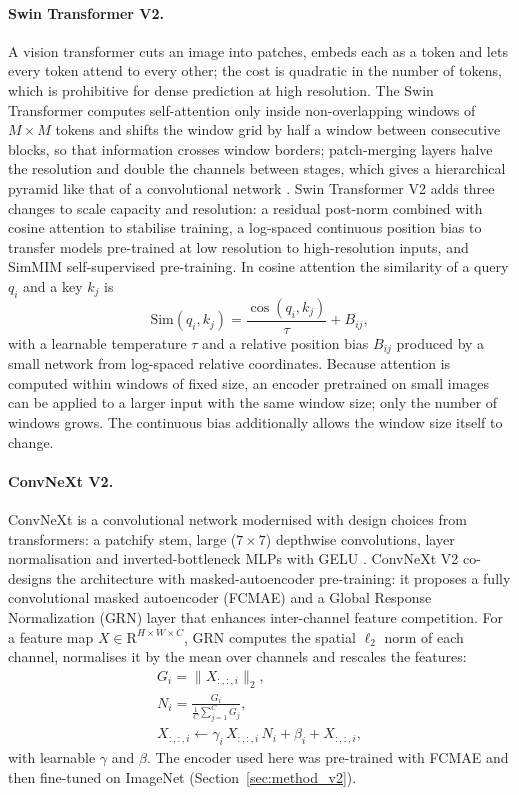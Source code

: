 \paragraph{Swin Transformer V2.} A vision transformer cuts an image into patches, embeds each as a token and lets every token attend to every
other; the cost is quadratic in the number of tokens, which is prohibitive for dense prediction at high resolution. The Swin Transformer computes
self-attention only inside non-overlapping windows of $M\times M$ tokens and shifts the window grid by half a window between consecutive blocks, so
that information crosses window borders; patch-merging layers halve the resolution and double the channels between stages, which gives a
hierarchical pyramid like that of a convolutional network \citep{dosovitskiy2021vit,liu2021swin}. Swin Transformer V2 \citep{liu2022swinv2} adds three changes to scale capacity and
resolution: a residual post-norm combined with cosine attention to stabilise training, a log-spaced continuous position bias to transfer models
pre-trained at low resolution to high-resolution inputs, and SimMIM self-supervised pre-training. In cosine attention the similarity of a query
$q_i$ and a key $k_j$ is
\begin{equation}
\mathrm{Sim}(q_i,k_j)=\frac{\cos(q_i,k_j)}{\tau}+B_{ij},
\label{eq:bg_cosattn}
\end{equation}
with a learnable temperature $\tau$ and a relative position bias $B_{ij}$ produced by a small network from log-spaced relative coordinates.
Because attention is computed within windows of fixed size, an encoder pretrained on small images can be applied to a larger input with the same
window size; only the number of windows grows. The continuous bias additionally allows the window size itself to change.

\paragraph{ConvNeXt V2.} ConvNeXt is a convolutional network modernised with design choices from transformers: a patchify stem, large ($7\times7$)
depthwise convolutions, layer normalisation and inverted-bottleneck MLPs with GELU \citep{liu2022convnext}. ConvNeXt V2 \citep{woo2023convnextv2} co-designs the
architecture with masked-autoencoder pre-training: it proposes a fully convolutional masked autoencoder (FCMAE) and a Global Response
Normalization (GRN) layer that enhances inter-channel feature competition. For a feature map $X\in\mathrm{R}^{H\times W\times C}$, GRN computes
the spatial $\ell_2$ norm of each channel, normalises it by the mean over channels and rescales the features:
\begin{equation}
\begin{gathered}
G_i=\lVert X_{:,:,i}\rVert_2,\\
N_i=\frac{G_i}{\frac1C\sum_{j=1}^{C}G_j},\\
X_{:,:,i}\leftarrow\gamma_i\,X_{:,:,i}\,N_i+\beta_i+X_{:,:,i},
\end{gathered}
\label{eq:bg_grn}
\end{equation}
with learnable $\gamma$ and $\beta$. The encoder used here was pre-trained with FCMAE and then fine-tuned on ImageNet \citep{deng2009imagenet}
(Section~\ref{sec:method_v2}).

